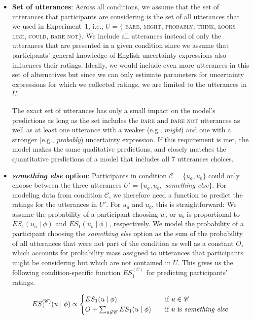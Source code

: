 \begin{itemize}
\item \textbf{Set of utterances}: Across all conditions, we assume that the set of utterances that participants are 
considering is the set of all utterances that we used in Experiment~1, i.e., $U= \{$ \textsc{bare}, \textsc{might}, 
\textsc{probably}, \textsc{think}, \textsc{looks like}, \textsc{could}, \textsc{bare not}$\}$. We include all utterances 
instead of only the utterances that are presented in a given condition since we assume that participants' general 
knowledge of English uncertainty expressions also influences their ratings. Ideally, we would include even more 
utterances in this set of alternatives but since we can only estimate parameters for uncertainty expressions for 
which we collected ratings, we are limited to the utterances in $U$. 

The exact set of utterances has only a small impact on the model's predictions as long as the set includes the \textsc{bare}
and \textsc{bare not} utterances as well as at least one utterance with a weaker 
(e.g., \textit{might}) and one with a stronger (e.g., \textit{probably})
uncertainty expression. If this requirement is met, the model makes the same qualitative predictions, 
and closely matches the quantitative predictions of a model that includes all 7 utterances choices.

\item \textbf{\textit{something else} option}: Participants in condition $\mathscr{C} = \{u_a, u_b\}$ 
could only choose between the three utterances $U' = \{u_a, u_b,$ \textit{something else}$\}$.
For modeling data from condition $\mathscr{C}$, we therefore need a function to predict the ratings 
for the utterances in $U'$. For $u_a$ and $u_b$, this is straightforward: We assume the probability 
of a participant choosing $u_a$ or $u_b$
is proportional to $ES_1(u_a \mid \phi)$ and $ES_1(u_b \mid \phi)$, respectively. 
We model the probability of a participant choosing the \textit{something else} option as the sum 
of the probability of all utterances that were not part of the condition as well as a constant $O$, 
which accounts for probability mass assigned to utterances that participants might be 
considering but which are not contained in $U$. This gives us the following condition-specific 
function $ES_1^{(\mathscr{C})}$ for predicting participants' ratings.

$$
ES_1^{(\mathscr{C})}(u \mid \phi) \propto 
    \begin{cases}
      ES_1(u \mid \phi) & \quad\mbox{if } u  \in \mathscr{C}\\
       O + \sum_{u \not \in \mathscr{C}} ES_1(u \mid \phi) & \quad \mbox{if $u$ is \textit{something else}} \\
   \end{cases}
$$


\end{itemize}
